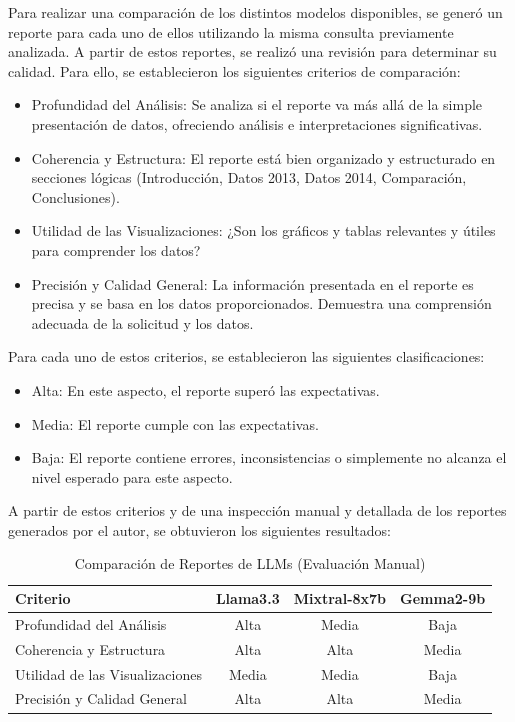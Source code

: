 Para realizar una comparación de los distintos modelos disponibles, se generó un reporte para cada uno de ellos utilizando la misma consulta previamente analizada. A partir de estos reportes, se realizó una revisión para determinar su calidad. Para ello, se establecieron los siguientes criterios de comparación:

\begin{itemize}
	\item{Profundidad del Análisis:} Se analiza si el reporte va más allá de la simple presentación de datos, ofreciendo análisis e interpretaciones significativas.
	\item{Coherencia y Estructura:} El reporte está bien organizado y estructurado en secciones lógicas (Introducción, Datos 2013, Datos 2014, Comparación, Conclusiones).
	\item{Utilidad de las Visualizaciones:} ¿Son los gráficos y tablas relevantes y útiles para comprender los datos?
	\item{Precisión y Calidad General:} La información presentada en el reporte es precisa y se basa en los datos proporcionados. Demuestra una comprensión adecuada de la solicitud y los datos.
\end{itemize}

Para cada uno de estos criterios, se establecieron las siguientes clasificaciones:

\begin{itemize}
	\item{Alta:} En este aspecto, el reporte superó las expectativas.
	\item{Media:} El reporte cumple con las expectativas.
	\item{Baja:} El reporte contiene errores, inconsistencias o simplemente no alcanza el nivel esperado para este aspecto.
\end{itemize}

A partir de estos criterios y de una inspección manual y detallada de los reportes generados por el autor, se obtuvieron los siguientes resultados:

\begin{table}[htbp]
	\centering
	\caption{Comparación de Reportes de LLMs (Evaluación Manual)}
	\label{tab:comparacion_reportes}
	\begin{tabular}{@{}lccc@{}}
		\toprule
		Criterio & Llama3.3 & Mixtral-8x7b & Gemma2-9b \\
		\midrule
		Profundidad del Análisis & Alta & Media & Baja \\
		Coherencia y Estructura & Alta & Alta & Media \\
		Utilidad de las Visualizaciones & Media & Media & Baja \\
		Precisión y Calidad General & Alta & Alta & Media \\
		\bottomrule
	\end{tabular}
\end{table}

